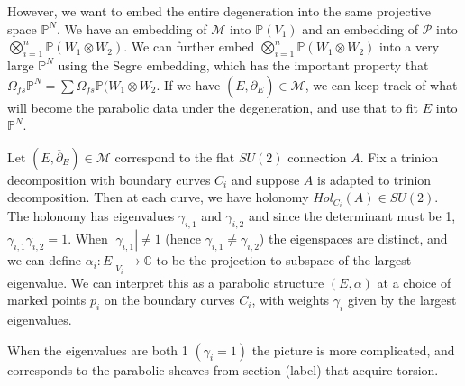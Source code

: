 \documentclass[]{article}
\newcommand{\PP}{\mathbb{P}}
\newcommand{\C}{\mathbb{C}}
\newcommand{\MM}{\mathcal{M}}
\newcommand{\dbar}{\overline{\partial}}
\newcommand{\cP}{\mathcal{P}}
\begin{document}
	However, we want to embed the entire degeneration into the same projective space $\PP^N$. We have an embedding of $\MM$ into $\PP(V_1)$ and an embedding of $\cP$ into $\bigotimes_{i=1}^n \PP(W_1 \otimes W_2)$. We can further embed $\bigotimes_{i=1}^n \PP(W_1 \otimes W_2)$ into a very large $\PP^N$ using the Segre embedding, which has the important property that $\Omega_{fs} \PP^N = \sum \Omega_{fs} \PP(W_1\otimes W_2$. If we have $(E,\dbar_E)\in\MM$, we can keep track of what will become the parabolic data under the degeneration, and use that to fit $E$ into $\PP^N$.
	
	Let $(E,\dbar_E)\in \MM$ correspond to the flat $SU(2)$ connection $A$. Fix a trinion decomposition with boundary curves $C_i$ and suppose $A$ is adapted to trinion decomposition. Then at each curve, we have holonomy $Hol_{C_i}(A) \in SU(2)$. The holonomy has eigenvalues $\gamma_{i,1}$ and $\gamma_{i,2}$ and since the determinant must be 1, $\gamma_{i,1}\gamma_{i,2} = 1$. When $|\gamma_{i,1}|\neq 1$ (hence $\gamma_{i,1} \neq \gamma_{i,2}$) the eigenspaces are distinct, and we can define $\alpha_i:E|_{V_i} \to \C$ to be the projection to subspace of the largest eigenvalue. We can interpret this as a parabolic structure $(E,\alpha)$ at a choice of marked points $p_i$ on the boundary curves $C_i$, with weights $\gamma_i$ given by the largest eigenvalues.
	
	When the eigenvalues are both 1 $(\gamma_i = 1)$ the picture is more complicated, and corresponds to the parabolic sheaves from section (label) that acquire torsion. 
\end{document}
